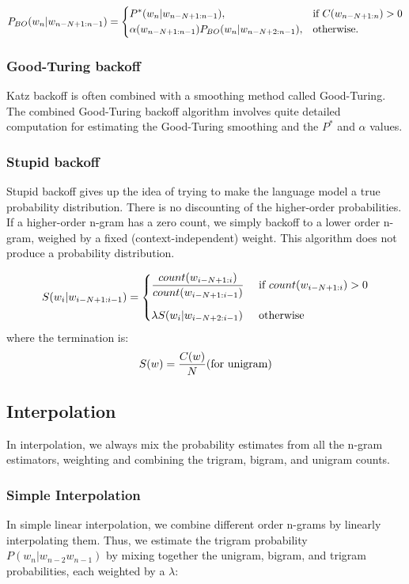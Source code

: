 \[
    P_{BO}(w_n|w_{n-N+1:n-1}) =
\begin{dcases} 
    P^*(w_n|w_{n-N+1:n-1}), & \text{if } C(w_{n-N+1:n}) > 0 \\
    \alpha(w_{n-N+1:n-1}) P_{BO}(w_n|w_{n-N+2:n-1}), & \text{otherwise}.
\end{dcases}
\]

\subsubsection{Good-Turing backoff}
Katz backoff is often combined with a smoothing method called Good-Turing. The combined Good-Turing backoff algorithm involves quite detailed computation for estimating the Good-Turing smoothing and the $P^*$ and $\alpha$ values.

\subsubsection{Stupid backoff}
Stupid backoff gives up the idea of trying to make the language model a true probability distribution. There is no discounting of the higher-order probabilities. If a higher-order n-gram has a zero count, we simply backoff to a lower order n-gram, weighed by a fixed (context-independent) weight. This algorithm does not produce a probability distribution.

\[
    S(w_i|w_{i-N+1:i-1}) = \begin{dcases}
        \dfrac{count(w_{i-N+1:i})}{count(w_{i-N+1:i-1})} & \text{ if $count(w_{i-N+1:i}) > 0$}\\[0.2cm]
        \lambda S(w_i|w_{i-N+2:i-1}) & \text{ otherwise}
    \end{dcases}
\]
where the termination is:
\[
    S(w) = \dfrac{C(w)}{N} \hfill \text{(for unigram)}
\]

\subsection{Interpolation}
In interpolation, we always mix the probability estimates from all the n-gram estimators, weighting and combining the trigram, bigram, and unigram counts.

\subsubsection{Simple Interpolation}
In simple linear interpolation, we combine different order n-grams by linearly interpolating them. Thus, we estimate the trigram probability $P(w_n|w_{n-2}w_{n-1})$ by mixing together the unigram, bigram, and trigram probabilities, each weighted by a $\lambda$:


